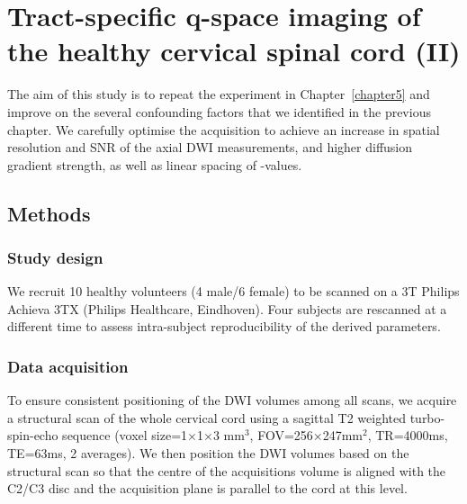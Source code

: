 \chapter{Tract-specific q-space imaging of the healthy cervical spinal cord (II)}
\label{chapter6}
The aim of this study is to repeat the experiment in Chapter~\ref{chapter5} and improve on the several confounding factors that we identified in the previous chapter. We carefully optimise the acquisition to achieve an increase in spatial resolution and \gls{SNR} of the axial \gls{DWI} measurements, and higher diffusion gradient strength, as well as linear spacing of {\q}-values.

\section{Methods}
\subsection{Study design}
We recruit 10 healthy volunteers (4 male/6 female) to be scanned on a 3T Philips Achieva 3TX (Philips Healthcare, Eindhoven). Four subjects are rescanned at a different time to assess intra-subject reproducibility of the derived parameters.
\subsection{Data acquisition}
To ensure consistent positioning of the \gls{DWI} volumes among all scans, we acquire a structural scan of the whole cervical cord using a sagittal T2 weighted turbo-spin-echo sequence (voxel size=1$\times$1$\times$3 mm$^3$, FOV=256$\times$247mm$^2$, TR=4000ms, TE=63ms, 2 averages). We then position the \gls{DWI} volumes based on the structural scan so that the centre of the acquisitions volume is aligned with the C2/C3 disc and the acquisition plane is parallel to the cord at this level.

